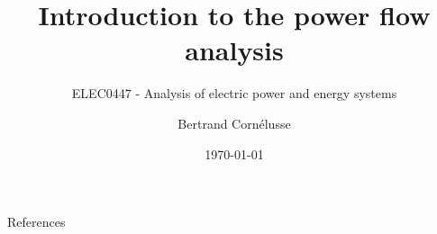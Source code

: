 \documentclass[aspectratio=169]{beamer}
\subtitle{ELEC0447 - Analysis of electric power and energy systems}
\title{Introduction to the power flow analysis}
\author[BC]{Bertrand Cornélusse}
\institute{Univeristy of Liège}
\date{\today}
\begin{document}


\begin{frame}[allowframebreaks]{References}


\end{frame}
\end{document}
